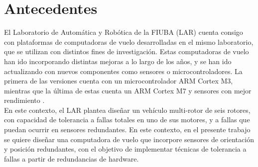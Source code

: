 \section{Antecedentes}

El Laboratorio de Automática y Robótica de la FIUBA (LAR) cuenta consigo con plataformas de computadoras de vuelo desarrolladas en el mismo laboratorio, que se utilizan con distintos fines de investigación. Estas computadoras de vuelo han ido incorporando distintas mejoras a lo largo de los años, y se han ido actualizando con nuevos componentes como sensores o microcontroladores. La primera de las versiones cuenta con un microcontrolador ARM Cortex M3, mientras que la última de estas cuenta un ARM Cortex M7 y sensores con mejor rendimiento \cite{garberoglio2019diseno}.\\


En este contexto, el LAR plantea diseñar un vehículo multi-rotor de seis rotores, con capacidad de tolerancia a fallas totales en uno de sus motores, y a fallas que puedan ocurrir en sensores redundantes. En este contexto, en el presente trabajo se quiere diseñar una computadora de vuelo que incorpore sensores de orientación y posición redundantes, con el objetivo de implementar técnicas de tolerancia a fallas a partir de redundancias de hardware.






